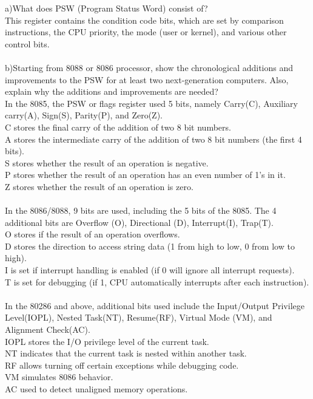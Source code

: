 \documentclass[12pt]{article}
\newenvironment{problem}[2][Problem]{\begin{trivlist}
\item[\hskip \labelsep {\bfseries #1}\hskip \labelsep {\bfseries #2.}]}{\end{trivlist}}
\begin{document}
\begin{problem}{5}a)What does PSW (Program Status Word) consist of?\\
This register contains the condition code bits, which are set by comparison instructions, the CPU
priority, the mode (user or kernel), and various other control bits.\\\\
b)Starting from 8088 or 8086 processor, show the chronological additions 
and improvements to the PSW for at least two next-generation computers. 
Also, explain why the additions and improvements are needed?\\
In the 8085, the PSW or flags register used 5 bits, namely
Carry(C), Auxiliary carry(A), Sign(S), Parity(P), and Zero(Z).\\
C stores the final carry of the addition of two 8 bit numbers.\\
A stores the intermediate carry of the addition of two 8 bit numbers (the first 4 bits).\\
S stores whether the result of an operation is negative.\\
P stores whether the result of an operation has an even number of 1's in it.\\
Z stores whether the result of an operation is zero.\cite{8085}\\\\
In the 8086/8088, 9 bits are used, including the 5 bits of the 8085.
The 4 additional bits are Overflow (O), Directional (D), Interrupt(I), Trap(T).\\
O stores if the result of an operation overflows.\\
D stores the direction to access string data (1 from high to low, 0 from low to high).\\
I is set if interrupt handling is enabled (if 0 will ignore all interrupt requests).\\
T is set for debugging (if 1, CPU automatically interrupts after each instruction).\cite{8086}\\\\
In the 80286 and above, additional bits used include the Input/Output Privilege Level(IOPL), Nested Task(NT),
Resume(RF), Virtual Mode (VM), and Alignment Check(AC).\\
IOPL stores the I/O privilege level of the current task.\\
NT indicates that the current task is nested within another task.\\
RF allows turning off certain exceptions while debugging code.\\
VM simulates 8086 behavior.\\
AC used to detect unaligned memory operations.\cite{80286}\\
\end{problem}
\end{document}
